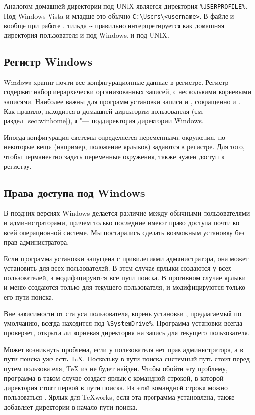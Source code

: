\documentclass{article}
\begin{document}
Аналогом домашней директории под UNIX является директория
\verb|%USERPROFILE%|.  Под  Windows Vista и младше  это обычно
\verb|C:\Users\<username>|.  В файле  и вообще при
работе \KPS{}, тильда \verb|~| правильно интерпретируется как домашняя
директория пользователя и под Windows, и
под UNIX.

\subsection{Регистр Windows}
\label{sec:registry}

Windows хранит почти все конфигурационные данные в регистре.  Регистр
содержит набор иерархически организованных записей, с несколькими
корневыми записями.  Наиболее важны для программ установки записи
 и , сокращенно
 и .  Как правило,  находится в
домашней директории пользователя (см. раздел~\ref{sec:winhome}), а
 "--- поддиректория директории Windows.

Иногда конфигурация системы определяется переменными окружения, но
некоторые вещи (например, положение ярлыков) задаются в регистре.  Для
того, чтобы перманентно задать переменные окружения, также нужен
доступ к регистру.

\subsection{Права доступа под Windows}
\label{sec:winpermissions}

В поздних версиях Windows делается различие между обычными
пользователями и администраторами, причем только последние имеют право
доступа почти ко всей операционной системе.   Мы
постарались сделать возможным установку \TL{} без прав
администратора.

Если программа установки запущена с привилегиями администратора, она
может установить \TL{} 
для всех пользователей.  В этом случае ярлыки создаются у всех
пользователей, и модифицируются все пути поиска.  В противном
случае ярлыки и меню создаются только для текущего пользователя, и
модифицируются только его пути поиска.  

Вне зависимости от статуса пользователя, корень установки \TL{},
предлагаемый по умолчанию, всегда находится под
\verb|%SystemDrive%|.  Программа установки всегда проверяет, открыта
ли корневая директория на запись для текущего пользователя.

Может возникнуть проблема, если у пользователя нет прав
администратора, а в пути поиска уже есть \TeX{}.  Поскольку в пути
поиска системный путь стоит перед путем пользователя, \TeX{} из \TL{}
не будет найден.  Чтобы обойти эту проблему, программа в таком случае
создает ярлык с командной строкой, в которой директория \TL{} стоит
первой в пути поиска.  Из этой командной строки можно пользоваться
\TL{}. Ярлык для \TeX{}works, если эта программа установлена, также
добавляет директории \TL{} в начало пути поиска.
\end{document}
